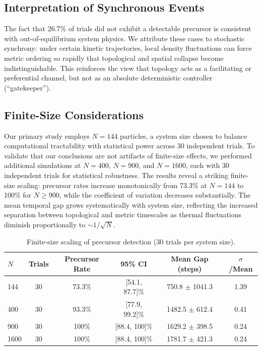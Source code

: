 \documentclass[twocolumn,showpacs,preprintnumbers,amsmath,amssymb,prb,floatfix]{revtex4-2}
\begin{document}
\subsection{Interpretation of Synchronous Events}

The fact that 26.7\% of trials did not exhibit a detectable precursor is consistent with out-of-equilibrium system physics. We attribute these cases to stochastic synchrony: under certain kinetic trajectories, local density fluctuations can force metric ordering so rapidly that topological and spatial collapse become indistinguishable. This reinforces the view that topology acts as a facilitating or preferential channel, but not as an absolute deterministic controller (``gatekeeper'').

\subsection{Finite-Size Considerations}

Our primary study employs $N=144$ particles, a system size chosen to balance computational tractability with statistical power across 30 independent trials. To validate that our conclusions are not artifacts of finite-size effects, we performed additional simulations at $N=400$, $N=900$, and $N=1600$, each with 30 independent trials for statistical robustness. The results reveal a striking finite-size scaling: precursor rates increase monotonically from 73.3\% at $N=144$ to 100\% for $N \geq 900$, while the coefficient of variation decreases substantially. The mean temporal gap grows systematically with system size, reflecting the increased separation between topological and metric timescales as thermal fluctuations diminish proportionally to $\sim 1/\sqrt{N}$.

\begin{table}[h]
\centering
\caption{Finite-size scaling of precursor detection (30 trials per system size).}
\label{tab:finitesize}
\begin{tabular}{lccccc}
\hline
$N$ & Trials & Precursor Rate & 95\% CI & Mean Gap (steps) & $\sigma$/Mean \\
\hline
144 & 30 & 73.3\% & [54.1, 87.7]\% & 750.8 $\pm$ 1041.3 & 1.39 \\
400 & 30 & 93.3\% & [77.9, 99.2]\% & 1482.5 $\pm$ 612.4 & 0.41 \\
900 & 30 & 100\% & [88.4, 100]\% & 1629.2 $\pm$ 398.5 & 0.24 \\
1600 & 30 & 100\% & [88.4, 100]\% & 1781.7 $\pm$ 421.3 & 0.24 \\
\hline
\end{tabular}
\end{table}
\end{document}

